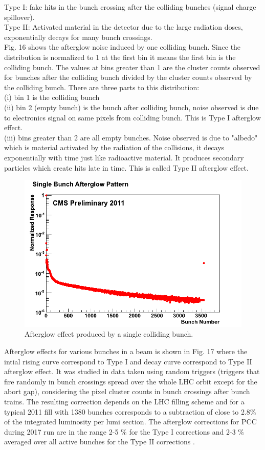 Type I: fake hits in the bunch crossing after the colliding bunches (signal charge spillover).\\

Type II: Activated material in the detector due to the large radiation doses, exponentially decays for many bunch crossings.\\

Fig. 16 shows the afterglow noise induced by one colliding bunch. Since the distribution is normalized to 1 at the first bin it means the first bin is the colliding bunch. The values at bins greater than 1 are the cluster counts observed for bunches after the colliding bunch divided by the cluster counts observed by the colliding bunch. There are three parts to this distribution: \\

(i) bin 1 is the colliding bunch \\

(ii) bin 2 (empty bunch) is the bunch after colliding bunch, noise observed is due to electronics signal on same pixels from colliding bunch. This is Type I afterglow effect. \\

(iii) bins greater than 2 are all empty bunches. Noise observed is due to "albedo" which is material activated by the radiation of the collisions, it decays exponentially with time just like radioactive material. It produces secondary particles which create hits late in time. This is called Type II afterglow effect. \\

\begin{figure}[H]
  \centering
  \includegraphics[width=0.6\columnwidth]{./SingleBunchAfterglow.png}
  \caption{Afterglow effect produced by a single colliding bunch.}
  \label{fig:LHC}
\end{figure}

 Afterglow effects for various bunches in a beam is shown in Fig. 17 where the intial rising curve correspond to Type I and decay curve correspond to Type II afterglow effect. It was studied in data taken using random triggers (triggers that fire randomly in bunch crossings spread over the whole LHC orbit except for the abort gap), considering the pixel cluster counts in bunch crossings after bunch trains. The resulting correction depends on the LHC filling scheme and for a typical 2011 fill with 1380 bunches corresponds to a subtraction of close to 2.8$\%$ of the integrated luminosity per lumi section. The afterglow corrections for PCC during 2017 run are in the range 2-5 $\%$ for the Type I corrections and 2-3 $\%$ averaged over all active bunches for the Type II corrections \cite{Sirunyan:2759951}.



